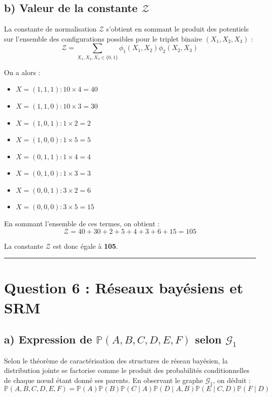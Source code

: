 \documentclass{article}
\begin{document}
\subsection*{b) Valeur de la constante $\mathcal{Z}$}

La constante de normalisation $\mathcal{Z}$ s'obtient en sommant le produit des potentiels sur l'ensemble des configurations possibles pour le triplet binaire $(X_1, X_2, X_3)$ :
\[ \mathcal{Z} = \sum_{X_1, X_2, X_3 \in \{0,1\}} \phi_1(X_1, X_2) \phi_2(X_2, X_3) \]

On a alors :
\begin{itemize}
    \item $X=(1,1,1) : 10 \times 4 = 40$
    \item $X=(1,1,0) : 10 \times 3 = 30$
    \item $X=(1,0,1) : 1 \times 2 = 2$
    \item $X=(1,0,0) : 1 \times 5 = 5$
    \item $X=(0,1,1) : 1 \times 4 = 4$
    \item $X=(0,1,0) : 1 \times 3 = 3$
    \item $X=(0,0,1) : 3 \times 2 = 6$
    \item $X=(0,0,0) : 3 \times 5 = 15$
\end{itemize}

En sommant l'ensemble de ces termes, on obtient :
\[ \mathcal{Z} = 40 + 30 + 2 + 5 + 4 + 3 + 6 + 15 = 105 \]

La constante $\mathcal{Z}$ est donc égale à \textbf{105}.

\vspace{1cm}
\hrule
\vspace{1cm}

\section*{Question 6 : Réseaux bayésiens et SRM}

\subsection*{a) Expression de $\mathbb{P}(A, B, C, D, E, F)$ selon $\mathcal{G}_1$}

Selon le théorème de caractérisation des structures de réseau bayésien, la distribution jointe se factorise comme le produit des probabilités conditionnelles de chaque nœud étant donné ses parents. En observant le graphe $\mathcal{G}_1$, on déduit :
\[ \mathbb{P}(A, B, C, D, E, F) = \mathbb{P}(A)\mathbb{P}(B)\mathbb{P}(C \mid A)\mathbb{P}(D \mid A, B)\mathbb{P}(E \mid C, D)\mathbb{P}(F \mid D) \]
\end{document}
